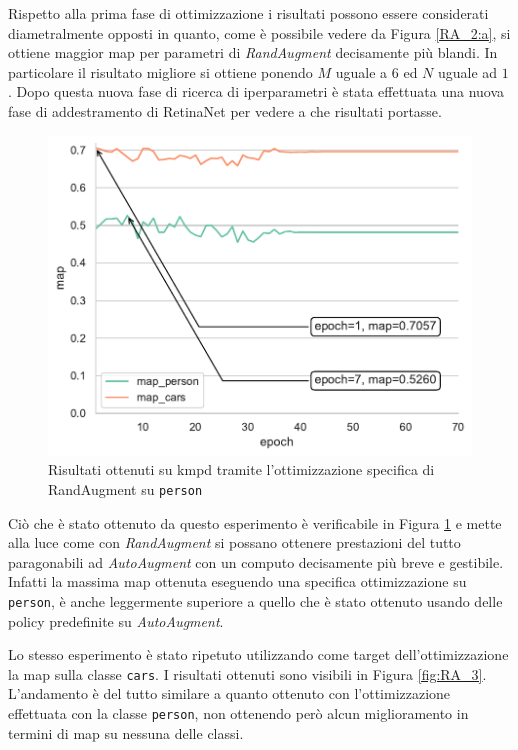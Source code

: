 Rispetto alla prima fase di ottimizzazione i risultati possono essere considerati diametralmente opposti in quanto, come è possibile vedere da Figura \ref{RA_2:a}, si ottiene maggior \ac{map} per parametri di \textit{RandAugment} decisamente più blandi. In particolare il risultato migliore si ottiene ponendo $M$ uguale a $6$ ed $N$ uguale ad $1$.
Dopo questa nuova fase di ricerca di iperparametri è stata effettuata una nuova fase di addestramento di RetinaNet per vedere a che risultati portasse.
\begin{figure}[]
    \centering
    \includegraphics[width=\textwidth]{images/graphic/map_person_ra.pdf}
    \caption{Risultati ottenuti su \ac{kmpd} tramite l'ottimizzazione specifica di RandAugment su \texttt{person}}
    \label{fig:ra_person}
\end{figure}

Ciò che è stato ottenuto da questo esperimento è verificabile in Figura \ref{fig:ra_person} e mette alla luce come con \textit{RandAugment} si possano ottenere prestazioni del tutto paragonabili ad \textit{AutoAugment} con un computo decisamente più breve e gestibile. Infatti la massima \ac{map} ottenuta eseguendo una specifica ottimizzazione su \texttt{person}, è anche leggermente superiore a quello che è stato ottenuto usando delle policy predefinite su \textit{AutoAugment}.

Lo stesso esperimento è stato ripetuto utilizzando come target dell'ottimizzazione la \ac{map} sulla classe \texttt{cars}. I risultati ottenuti sono visibili in Figura \ref{fig:RA_3}.
L'andamento è del tutto similare a quanto ottenuto con l'ottimizzazione effettuata con la classe \texttt{person}, non ottenendo però alcun miglioramento in termini di \ac{map} su nessuna delle classi.

